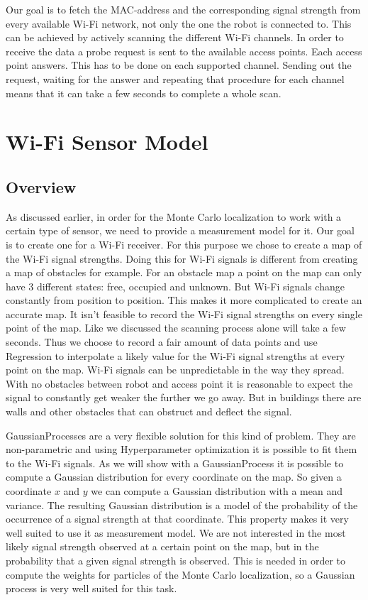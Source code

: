 Our goal is to fetch the MAC-address and the corresponding signal strength from every available Wi-Fi network, not only the one the robot is connected to. This can be achieved by actively scanning the different Wi-Fi channels. In order to receive the data a probe request is sent to the available access points. Each access point answers. This has to be done on each supported channel. Sending out the request, waiting for the answer and repeating that procedure for each channel means that it can take a few seconds to complete a whole scan. 

\section{Wi-Fi Sensor Model} \label{sec:gp}
\subsection{Overview}
As discussed earlier, in order for the Monte Carlo localization to work with a certain type of sensor, we need to provide a measurement model for it. Our goal is to create one for a Wi-Fi receiver. For this purpose we chose to create a map of the Wi-Fi signal strengths. Doing this for Wi-Fi signals is different from creating a map of obstacles for example. For an obstacle map a point on the map can only have 3 different states: free, occupied and unknown. But Wi-Fi signals change constantly from position to position. This makes it more complicated to create an accurate map. It isn't feasible to record the Wi-Fi signal strengths on every single point of the map. Like we discussed the scanning process alone will take a few seconds. Thus we choose to record a fair amount of data points and use \gls{Regression} to interpolate a likely value for the Wi-Fi signal strengths at every point on the map. Wi-Fi signals can be unpredictable in the way they spread. With no obstacles between robot and access point it is reasonable to expect the signal to constantly get weaker the further we go away. But in buildings there are walls and other obstacles that can obstruct and deflect the signal.

\Gls{GaussianProcess}es are a very flexible solution for this kind of problem. They are non-parametric and using \gls{Hyperparameter} optimization it is possible to fit them to the Wi-Fi signals. As we will show with a \Gls{GaussianProcess} it is possible to compute a Gaussian distribution for every coordinate on the map. So given a coordinate $x$ and $y$ we can compute a Gaussian distribution with a mean and variance. The resulting Gaussian distribution is a model of the probability of the occurrence of a signal strength at that coordinate. This property makes it very well suited to use it as measurement model. We are not interested in the most likely signal strength observed at a certain point on the map, but in the probability that a given signal strength is observed. This is needed in order to compute the weights for particles of the Monte Carlo localization, so a Gaussian process is very well suited for this task.

